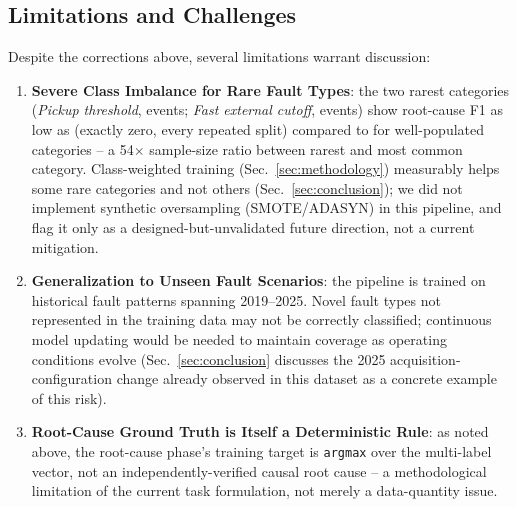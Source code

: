 \subsection{Limitations and Challenges}

Despite the corrections above, several limitations warrant discussion:

\begin{enumerate}
    \item \textbf{Severe Class Imbalance for Rare Fault Types}: the two rarest categories (\textit{Pickup threshold}, \MetricZeroZeroDataAttritionChainGtPassingSeuilPickUp{} events; \textit{Fast external cutoff}, \MetricZeroZeroDataAttritionChainGtPassingCoupureExterneRapide{} events) show root-cause F1 as low as \MetricZeroEightPhaseThreeaRootcauseStabilityPerLabelFOneCoupureExterneRapideMean{} (exactly zero, every repeated split) compared to \MetricZeroEightPhaseThreeaRootcauseStabilityPerLabelFOneDPSeuilDeSCuritRFMean{} for well-populated categories -- a 54$\times$ sample-size ratio between rarest and most common category. %
Class-weighted training (Sec.~\ref{sec:methodology}) measurably helps some rare categories and not others (Sec.~\ref{sec:conclusion}); we did not implement synthetic oversampling (SMOTE/ADASYN) in this pipeline, and flag it only as a designed-but-unvalidated future direction, not a current mitigation.

    \item \textbf{Generalization to Unseen Fault Scenarios}: the pipeline is trained on historical fault patterns spanning 2019--2025. %
Novel fault types not represented in the training data may not be correctly classified; continuous model updating would be needed to maintain coverage as operating conditions evolve (Sec.~\ref{sec:conclusion} discusses the 2025 acquisition-configuration change already observed in this dataset as a concrete example of this risk). %

    \item \textbf{Root-Cause Ground Truth is Itself a Deterministic Rule}: as noted above, the root-cause phase's %
training target is \texttt{argmax} over the multi-label vector, not an independently-verified causal root cause -- a methodological limitation of the current task formulation, not merely a data-quantity issue.


\end{enumerate}
